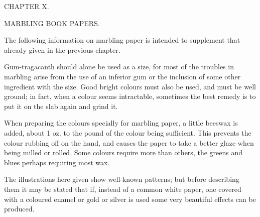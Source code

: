 \documentclass[twoside]{book}
\begin{document}
\pagebreak


\thispagestyle{empty}

\vspace*{\fill}

\begin{center}

\begin{large}CHAPTER X.\end{large}

\begin{small}MARBLING BOOK PAPERS.\end{small}

\end{center}

\noindent
The following information on marbling paper is
intended to supplement that already given in the
previous chapter.

Gum-tragacanth should alone be used as a
size, for most of the troubles in marbling arise
from the use of an inferior gum or the inclusion of
some other ingredient with the size. Good bright
colours must also be used, and must be well
ground; in fact, when a colour seems intractable,
sometimes the best remedy is to put it on the slab
again and grind it.

When preparing the colours specially for marbling
paper, a little beeswax is added, about
1 oz. to the pound of the colour being sufficient.
This prevents the colour rubbing off on the hand,
and causes the paper to take a better glaze when
being milled or rolled. Some colours require more
than others, the greens and blues perhaps requiring
most wax.

The illustrations here given show well-known
patterns; but before describing them it may be
stated that if, instead of a common white paper,
one covered with a coloured enamel or gold or
silver is used some very beautiful effects can be
produced.
\end{document}
